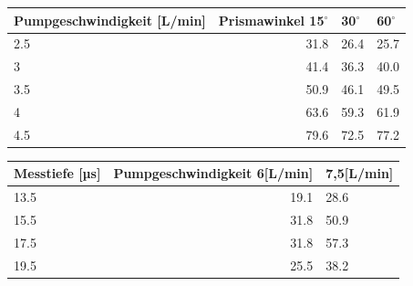 \documentclass[titlepage=firstcover, captions=tableheading]{scrartcl}
\begin{document}
        \begin{minipage}{\linewidth}
            \begin{table}[H]
                \centering
            
            \begin{tabular}{lrll}
                \toprule
                Pumpgeschwindigkeit [L/min] & Prismawinkel 15$^{\circ}$ & 30$^{\circ}$ & 60$^{\circ}$ \\
                \midrule
                2.5   &  31.8  &  26.4   & 25.7  \\ 
                3     &  41.4  &  36.3   & 40.0  \\ 
                3.5   &  50.9  &  46.1   & 49.5  \\ 
                4     &  63.6  &  59.3   & 61.9  \\ 
                4.5   &  79.6  &  72.5   & 77.2  \\    
                \bottomrule
                
            \end{tabular}
            \label{tab:3}
            \end{table}

            \end{minipage}
            \begin{minipage}{\linewidth}
                \begin{table}[H]
                    \centering
                
                \begin{tabular}{lrl}
                    \toprule
                    Messtiefe [µs] & Pumpgeschwindigkeit 6[L/min] & 7,5[L/min]\\
                    \midrule
                    13.5  &  19.1  &  28.6 \\
                    15.5  &  31.8  &  50.9 \\
                    17.5  &  31.8  &  57.3 \\
                    19.5  &  25.5  &  38.2 \\  
                    \bottomrule
                    
                \end{tabular}
                \label{tab:78}
                \end{table}
                \end{minipage}
\end{document}
